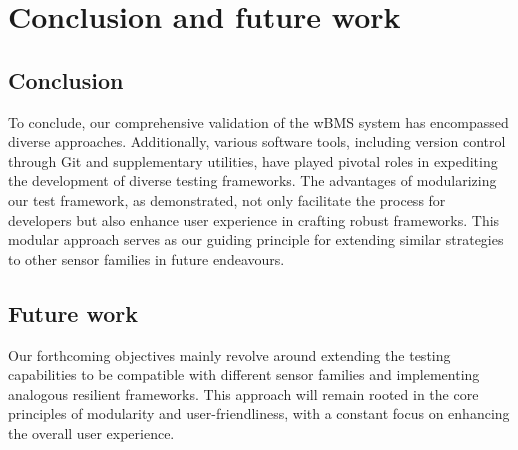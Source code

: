 \chapter{Conclusion and future work} %

\label{ch:future}


\section{Conclusion}
To conclude, our comprehensive validation of the wBMS system has encompassed diverse approaches. Additionally, various software tools, including version control through Git and supplementary utilities, have played pivotal roles in expediting the development of diverse testing frameworks. The advantages of modularizing our test framework, as demonstrated, not only facilitate the process for developers but also enhance user experience in crafting robust frameworks. This modular approach serves as our guiding principle for extending similar strategies to other sensor families in future endeavours.


\section{Future work}

Our forthcoming objectives mainly revolve around extending the testing capabilities to be compatible with different sensor families and implementing analogous resilient frameworks. This approach will remain rooted in the core principles of modularity and user-friendliness, with a constant focus on enhancing the overall user experience.